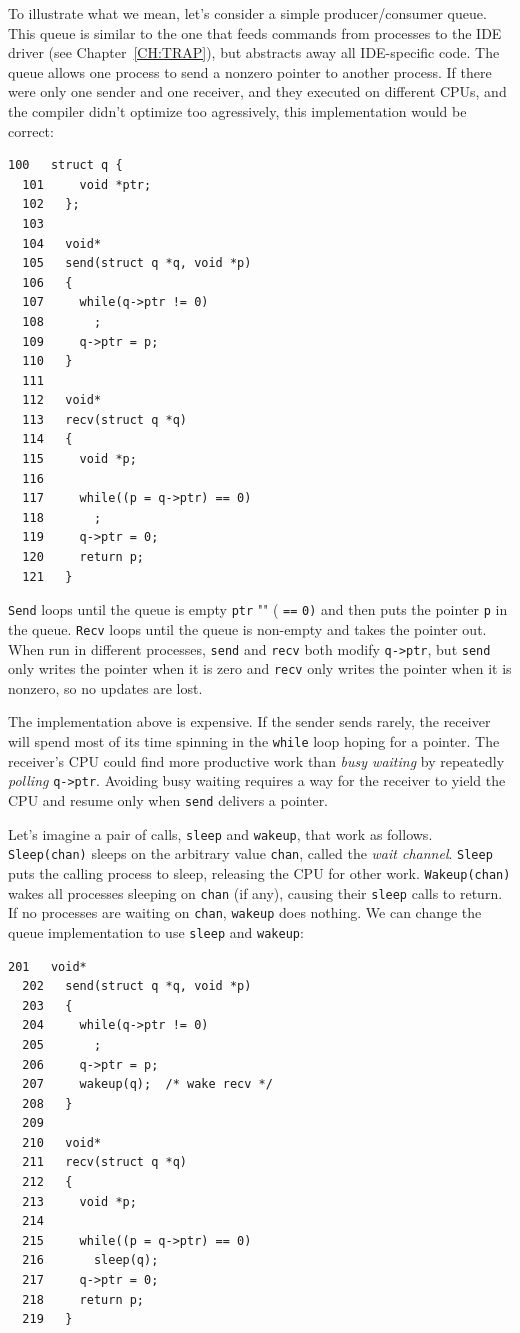 To illustrate what we mean, let's consider a
simple producer/consumer queue.
This queue is similar to the one that feeds commands from processes
to the IDE driver
(see Chapter~\ref{CH:TRAP}), but abstracts away all
IDE-specific code.
The queue allows one process to send a nonzero pointer
to another process.
If there were only one sender and one receiver,
and they executed on different CPUs,
and the compiler didn't optimize too agressively,
this implementation would be correct:
\begin{lstlisting}[]
  100	struct q {
  101	  void *ptr;
  102	};
  103	
  104	void*
  105	send(struct q *q, void *p)
  106	{
  107	  while(q->ptr != 0)
  108	    ;
  109	  q->ptr = p;
  110	}
  111	
  112	void*
  113	recv(struct q *q)
  114	{
  115	  void *p;
  116	
  117	  while((p = q->ptr) == 0)
  118	    ;
  119	  q->ptr = 0;
  120	  return p;
  121	}
\end{lstlisting}
\lstinline{Send}
loops until the queue is empty
\lstinline{ptr} "" (
\lstinline{==}
\lstinline{0)}
and then puts the pointer
\lstinline{p}
in the queue.
\lstinline{Recv}
loops until the queue is non-empty
and takes the pointer out.
When run in different processes,
\lstinline{send}
and
\lstinline{recv}
both modify
\lstinline{q->ptr},
but
\lstinline{send}
only writes the pointer when it is zero
and
\lstinline{recv}
only writes the pointer when it is nonzero,
so no updates are lost.

The implementation above 
is expensive.  If the sender sends
rarely, the receiver will spend most
of its time spinning in the 
\lstinline{while}
loop hoping for a pointer.
The receiver's CPU could find more productive work than
\textit{busy waiting}
by repeatedly 
\textit{polling}
\lstinline{q->ptr}.
Avoiding busy waiting requires
a way for the receiver to yield the CPU
and resume only when 
\lstinline{send}
delivers a pointer.

Let's imagine a pair of calls, 
\lstinline{sleep}
and
\lstinline{wakeup},
that work as follows.
\lstinline{Sleep(chan)}
sleeps on the arbitrary value
\lstinline{chan},
called the 
\textit{wait channel}.
\lstinline{Sleep}
puts the calling process to sleep, releasing the CPU
for other work.
\lstinline{Wakeup(chan)}
wakes all processes sleeping on
\lstinline{chan}
(if any), causing their
\lstinline{sleep}
calls to return.
If no processes are waiting on
\lstinline{chan},
\lstinline{wakeup}
does nothing.
We can change the queue implementation to use
\lstinline{sleep}
and
\lstinline{wakeup}:
\begin{lstlisting}[]
  201	void*
  202	send(struct q *q, void *p)
  203	{
  204	  while(q->ptr != 0)
  205	    ;
  206	  q->ptr = p;
  207	  wakeup(q);  /* wake recv */
  208	}
  209	
  210	void*
  211	recv(struct q *q)
  212	{
  213	  void *p;
  214	
  215	  while((p = q->ptr) == 0)
  216	    sleep(q);
  217	  q->ptr = 0;
  218	  return p;
  219	}
\end{lstlisting}

